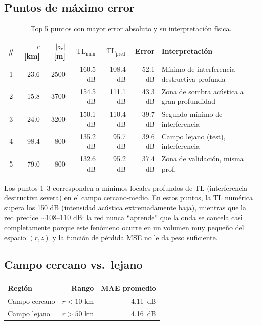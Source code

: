 \documentclass[12pt,a4paper]{article}
\newcommand{\TL}{\mathrm{TL}}
\begin{document}
\subsection{Puntos de máximo error}

\begin{table}[H]
\centering
\caption{Top 5 puntos con mayor error absoluto y su interpretación física.}
\label{tab:top5}
\begin{tabular}{crrrrrp{5.5cm}}
\toprule
\# & $r$ [km] & $|z_r|$ [m] & $\TL_{\text{num}}$ & $\TL_{\text{pred}}$ & Error & Interpretación \\
\midrule
1 & 23.6 & 2500 & 160.5 dB & 108.4 dB & 52.1 dB & Mínimo de interferencia destructiva profunda \\
2 & 15.8 & 3700 & 154.5 dB & 111.1 dB & 43.3 dB & Zona de sombra acústica a gran profundidad \\
3 & 24.0 & 3200 & 150.1 dB & 110.4 dB & 39.7 dB & Segundo mínimo de interferencia \\
4 & 98.4 &  800 & 135.2 dB &  95.7 dB & 39.6 dB & Campo lejano (test), interferencia \\
5 & 79.0 &  800 & 132.6 dB &  95.2 dB & 37.4 dB & Zona de validación, misma prof. \\
\bottomrule
\end{tabular}
\end{table}

Los puntos 1--3 corresponden a mínimos locales profundos de TL (interferencia
destructiva severa) en el campo cercano-medio. En estos puntos, la TL numérica
supera los 150 dB (intensidad acústica extremadamente baja), mientras que la
red predice $\sim$108--110 dB: la red nunca ``aprende'' que la onda se
cancela casi completamente porque este fenómeno ocurre en un volumen muy
pequeño del espacio $(r,z)$ y la función de pérdida MSE no le da peso
suficiente.

\subsection{Campo cercano vs.\ lejano}

\begin{center}
\begin{tabular}{lrr}
\toprule
Región & Rango & MAE promedio \\
\midrule
Campo cercano & $r < 10$ km  & \SI{4.11}{dB} \\
Campo lejano  & $r > 50$ km  & \SI{4.16}{dB} \\
\bottomrule
\end{tabular}
\end{center}
\end{document}
